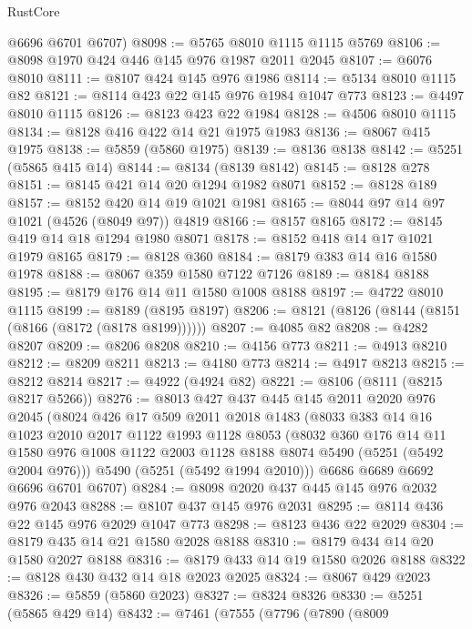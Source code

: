 \begin{lexlean}{RustCore}
\begin{coremodule}
      @6696
      @6701
      @6707)
@8098 := @5765 @8010 @1115 @1115 @5769
@8106 := @8098 @1970 @424 @446 @145 @976 @1987 @2011 @2045
@8107 := @6076 @8010
@8111 := @8107 @424 @145 @976 @1986
@8114 := @5134 @8010 @1115 @82
@8121 := @8114 @423 @22 @145 @976 @1984 @1047 @773
@8123 := @4497 @8010 @1115
@8126 := @8123 @423 @22 @1984
@8128 := @4506 @8010 @1115
@8134 := @8128 @416 @422 @14 @21 @1975 @1983
@8136 := @8067 @415 @1975
@8138 := @5859 (@5860 @1975)
@8139 := @8136 @8138
@8142 := @5251 (@5865 @415 @14)
@8144 := @8134 (@8139 @8142)
@8145 := @8128 @278
@8151 := @8145 @421 @14 @20 @1294 @1982 @8071
@8152 := @8128 @189
@8157 := @8152 @420 @14 @19 @1021 @1981
@8165 := @8044 @97 @14 @97 @1021 (@4526 (@8049 @97)) @4819
@8166 := @8157 @8165
@8172 := @8145 @419 @14 @18 @1294 @1980 @8071
@8178 := @8152 @418 @14 @17 @1021 @1979 @8165
@8179 := @8128 @360
@8184 := @8179 @383 @14 @16 @1580 @1978
@8188 := @8067 @359 @1580 @7122 @7126
@8189 := @8184 @8188
@8195 := @8179 @176 @14 @11 @1580 @1008 @8188
@8197 := @4722 @8010 @1115
@8199 := @8189 (@8195 @8197)
@8206 := @8121 (@8126 (@8144 (@8151 (@8166 (@8172 (@8178 @8199))))))
@8207 := @4085 @82
@8208 := @4282 @8207
@8209 := @8206 @8208
@8210 := @4156 @773
@8211 := @4913 @8210
@8212 := @8209 @8211
@8213 := @4180 @773
@8214 := @4917 @8213
@8215 := @8212 @8214
@8217 := @4922 (@4924 @82)
@8221 := @8106 (@8111 (@8215 @8217 @5266))
@8276 := @8013
    @427
    @437
    @445
    @145
    @2011
    @2020
    @976
    @2045
    (@8024
      @426
      @17
      @509
      @2011
      @2018
      @1483
      (@8033
        @383
        @14
        @16
        @1023
        @2010
        @2017
        @1122
        @1993
        @1128
        @8053
        (@8032
          @360
          @176
          @14
          @11
          @1580
          @976
          @1008
          @1122
          @2003
          @1128
          @8188
          @8074
          @5490
          (@5251 (@5492 @2004 @976)))
        @5490
        (@5251 (@5492 @1994 @2010)))
      @6686
      @6689
      @6692
      @6696
      @6701
      @6707)
@8284 := @8098 @2020 @437 @445 @145 @976 @2032 @976 @2043
@8288 := @8107 @437 @145 @976 @2031
@8295 := @8114 @436 @22 @145 @976 @2029 @1047 @773
@8298 := @8123 @436 @22 @2029
@8304 := @8179 @435 @14 @21 @1580 @2028 @8188
@8310 := @8179 @434 @14 @20 @1580 @2027 @8188
@8316 := @8179 @433 @14 @19 @1580 @2026 @8188
@8322 := @8128 @430 @432 @14 @18 @2023 @2025
@8324 := @8067 @429 @2023
@8326 := @5859 (@5860 @2023)
@8327 := @8324 @8326
@8330 := @5251 (@5865 @429 @14)
@8432 := @7461
    (@7555
      (@7796
        (@7890
          (@8009

\end{coremodule}
\end{lexlean}
